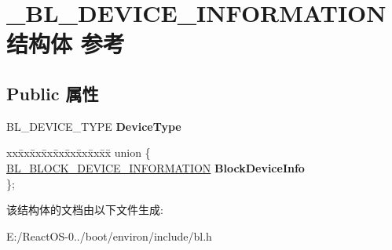 \hypertarget{struct___b_l___d_e_v_i_c_e___i_n_f_o_r_m_a_t_i_o_n}{}\section{\+\_\+\+B\+L\+\_\+\+D\+E\+V\+I\+C\+E\+\_\+\+I\+N\+F\+O\+R\+M\+A\+T\+I\+O\+N结构体 参考}
\label{struct___b_l___d_e_v_i_c_e___i_n_f_o_r_m_a_t_i_o_n}
\subsection*{Public 属性}
\begin{DoxyCompactItemize}
\item 
\mbox{\label{struct___b_l___d_e_v_i_c_e___i_n_f_o_r_m_a_t_i_o_n_a7ace682574eee91f6bff865ccefd3c33}} 
B\+L\+\_\+\+D\+E\+V\+I\+C\+E\+\_\+\+T\+Y\+PE {\bfseries Device\+Type}
\item 
\mbox{\label{struct___b_l___d_e_v_i_c_e___i_n_f_o_r_m_a_t_i_o_n_a0ba8912cf203b11987b48c498fced45b}} 
\begin{tabbing}
xx\=xx\=xx\=xx\=xx\=xx\=xx\=xx\=xx\=\kill
union \{\\
\>\hyperlink{struct___b_l___b_l_o_c_k___d_e_v_i_c_e___i_n_f_o_r_m_a_t_i_o_n}{BL\_BLOCK\_DEVICE\_INFORMATION} {\bfseries BlockDeviceInfo}\\
\}; \\

\end{tabbing}\end{DoxyCompactItemize}


该结构体的文档由以下文件生成\+:\begin{DoxyCompactItemize}
\item 
E\+:/\+React\+O\+S-\/0../boot/environ/include/bl.\+h\end{DoxyCompactItemize}
